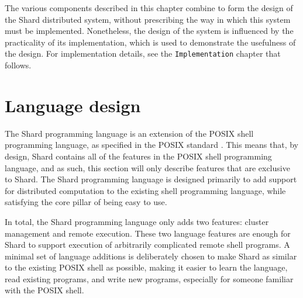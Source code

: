 \documentclass[oneside]{report}
\begin{document}
The various components described in this chapter combine to form the design of the Shard distributed system, without prescribing the way in which this system must be implemented.
Nonetheless, the design of the system is influenced by the practicality of its implementation, which is used to demonstrate the usefulness of the design.
For implementation details, see the \texttt{Implementation} chapter that follows.

\section{Language design}


The Shard programming language is an extension of the POSIX shell programming language, as specified in the POSIX standard \cite{posix2017}.
This means that, by design, Shard contains all of the features in the POSIX shell programming language, and as such, this section will only describe features that are exclusive to Shard.
The Shard programming language is designed primarily to add support for distributed computation to the existing shell programming language, while satisfying the core pillar of being easy to use.

In total, the Shard programming language only adds two features: cluster management and remote execution.
These two language features are enough for Shard to support execution of arbitrarily complicated remote shell programs.
A minimal set of language additions is deliberately chosen to make Shard as similar to the existing POSIX shell as possible, making it easier to learn the language, read existing programs, and write new programs, especially for someone familiar with the POSIX shell.
\end{document}
